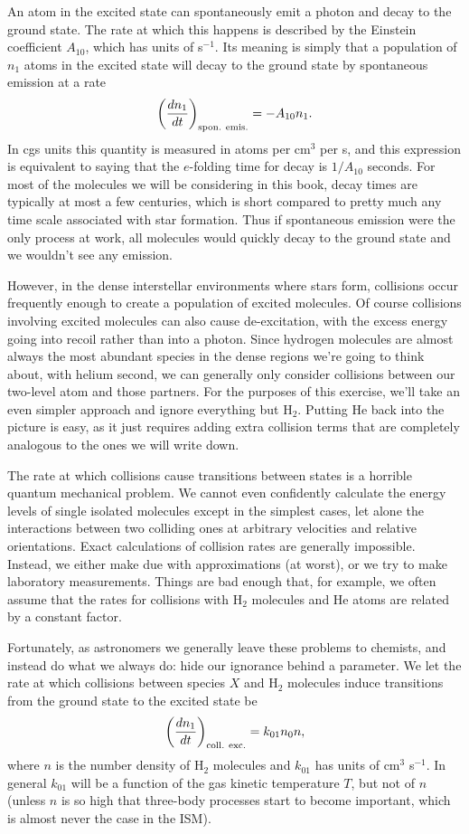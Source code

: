 An atom in the excited state can spontaneously emit a photon and decay to the ground state. The rate at which this happens is described by the Einstein coefficient $A_{10}$, which has units of s$^{-1}$. Its meaning is simply that a population of $n_1$ atoms in the excited state will decay to the ground state by spontaneous emission at a rate 
\begin{equation}
\left(\frac{dn_1}{dt}\right)_{\rm spon.~emis.} = -A_{10} n_1.
\end{equation}
In cgs units this quantity is measured in atoms per cm$^3$ per s, and this expression is equivalent to saying that the $e$-folding time for decay is $1/A_{10}$ seconds. For most of the molecules we will be considering in this book, decay times are typically at most a few centuries, which is short compared to pretty much any time scale associated with star formation. Thus if spontaneous emission were the only process at work, all molecules would quickly decay to the ground state and we wouldn't see any emission.

However, in the dense interstellar environments where stars form, collisions occur frequently enough to create a population of excited molecules. Of course collisions involving excited molecules can also cause de-excitation, with the excess energy going into recoil rather than into a photon. Since hydrogen molecules are almost always the most abundant species in the dense regions we're going to think about, with helium second, we can generally only consider collisions between our two-level atom and those partners. For the purposes of this exercise, we'll take an even simpler approach and ignore everything but H$_2$. Putting He back into the picture is easy, as it just requires adding extra collision terms that are completely analogous to the ones we will write down.

The rate at which collisions cause transitions between states is a horrible quantum mechanical problem. We cannot even confidently calculate the energy levels of single isolated molecules except in the simplest cases, let alone the interactions between two colliding ones at arbitrary velocities and relative orientations. Exact calculations of collision rates are generally impossible. Instead, we either make due with approximations (at worst), or we try to make laboratory measurements. Things are bad enough that, for example, we often assume that the rates for collisions with H$_2$ molecules and He atoms are related by a constant factor.

Fortunately, as astronomers we generally leave these problems to chemists, and instead do what we always do: hide our ignorance behind a parameter. We let the rate at which collisions between species $X$ and H$_2$ molecules induce transitions from the ground state to the excited state be
\begin{equation}
\left(\frac{dn_1}{dt}\right)_{\rm coll.~exc.} = k_{01} n_0 n,
\end{equation}
where $n$ is the number density of H$_2$ molecules and $k_{01}$ has units of cm$^3$ s$^{-1}$. In general $k_{01}$ will be a function of the gas kinetic temperature $T$, but not of $n$ (unless $n$ is so high that three-body processes start to become important, which is almost never the case in the ISM). 


